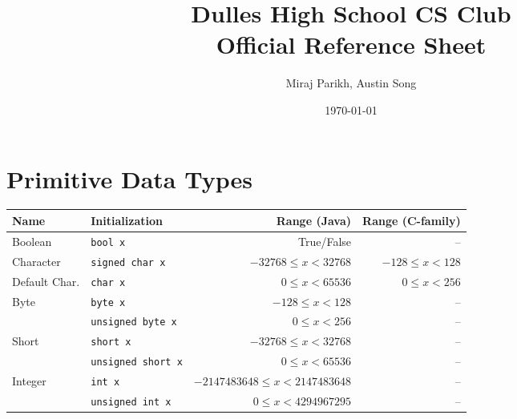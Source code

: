 \documentclass[11pt]{article}
\title{Dulles High School CS Club\\Official Reference Sheet}
\date{\today}
\author{Miraj Parikh, Austin Song}
\begin{document}

{\let\newpage\relax\maketitle} %

\renewcommand{\arraystretch}{1.25}
\section{Primitive Data Types}
\begin{center}\begin{tabular}{llrr}\toprule
  Name          & Initialization              & Range (Java) & Range (C-family) \\\midrule
  Boolean       & \lstinline|bool x|          & True/False & --\\\midrule
  Character     & \lstinline|signed char x|   & \(-32768 \leq x < 32768\) & \(-128 \leq x < 128\) \\ 
  Default Char. & \lstinline|char x|          & \(0 \leq x < 65536\) & \(0 \leq x < 256\) \\
  Byte          & \lstinline|byte x|          & \(-128 \leq x < 128\) & -- \\
                & \lstinline|unsigned byte x| & \(0 \leq x < 256\) & -- \\
  Short         & \lstinline|short x|         & \(-32768 \leq x < 32768\) & -- \\
                & \lstinline|unsigned short x|& \(0 \leq x < 65536\) & -- \\
  Integer       & \lstinline|int x|           & \(-2147483648 \leq x < 2147483648\) & -- \\
                & \lstinline|unsigned int x|  & \(0 \leq x < 4294967295\) & -- \\
\end{tabular}\end{center}

\setlength{\tabcolsep}{1pt}
\renewcommand{\arraystretch}{1}
\end{document}
